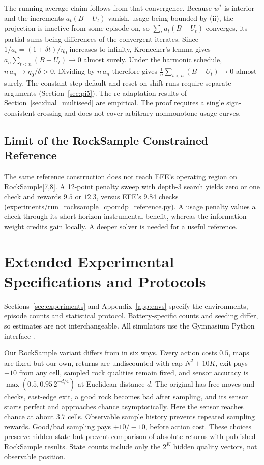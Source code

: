 \documentclass[manuscript, screen, review]{jair}
\begin{document}
The running-average claim follows from that convergence. Because $w^*$ is interior and the increments $a_t (B - U_t)$ vanish, usage being bounded by (ii), the projection is inactive from some episode on, so $\sum_t a_t (B - U_t)$ converges, its partial sums being differences of the convergent iterates. Since $1/a_t = (1 + \delta t)/\eta_0$ increases to infinity, Kronecker's lemma gives $a_n \sum_{t<n} (B - U_t) \to 0$ almost surely. Under the harmonic schedule, $n\,a_n \to \eta_0/\delta > 0$. Dividing by $n\,a_n$ therefore gives $\frac{1}{n}\sum_{t<n} (B - U_t) \to 0$ almost surely. The constant-step default and reset-on-shift runs require separate arguments (Section~\ref{sec:pi5}). The re-adaptation results of Section~\ref{sec:dual_multiseed} are empirical. The proof requires a single sign-consistent crossing and does not cover arbitrary nonmonotone usage curves.

\subsection{Limit of the RockSample Constrained Reference}
\label{app:theory_positioning}

The same reference construction does not reach EFE's operating region on RockSample[7,8]. A 12-point penalty sweep with depth-3 search yields zero or one check and rewards $9.5$ or $12.3$, versus EFE's $9.84$ checks (\url{experiments/run_rocksample_cpomdp_reference.py}). A usage penalty values a check through its short-horizon instrumental benefit, whereas the information weight credits gain locally. A deeper solver is needed for a useful reference.

\FloatBarrier
\section{Extended Experimental Specifications and Protocols}
\label{app:experimental_protocol}

Sections~\ref{sec:experiments} and Appendix~\ref{app:envs} specify the environments, episode counts and statistical protocol. Battery-specific counts and seeding differ, so estimates are not interchangeable. All simulators use the Gymnasium Python interface \citep{towers2024}.

Our RockSample variant differs from \citet{smith2004} in six ways. Every action costs $0.5$, maps are fixed but our own, returns are undiscounted with cap $N^2+10K$, exit pays $+10$ from any cell, sampled rock qualities remain fixed, and sensor accuracy is $\max(0.5,0.95\,2^{-d/4})$ at Euclidean distance $d$. The original has free moves and checks, east-edge exit, a good rock becomes bad after sampling, and its sensor starts perfect and approaches chance asymptotically. Here the sensor reaches chance at about $3.7$ cells. Observable sample history prevents repeated sampling rewards. Good/bad sampling pays $+10/-10$, before action cost. These choices preserve hidden state but prevent comparison of absolute returns with published RockSample results. State counts include only the $2^K$ hidden quality vectors, not observable position.
\end{document}
